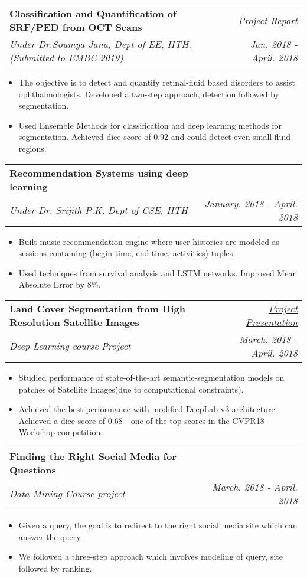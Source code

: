 \documentclass[letterpaper,11pt]{article}
\makeatletter
\newcommand{\resumeSubheading}[4]{
  \vspace{-1pt}\item
    \begin{tabular*}{0.97\textwidth}{l@{\extracolsep{\fill}}r}
      \textbf{#1} & #2 \\
      \textit{\small#3} & \textit{\small #4} \\
    \end{tabular*}\vspace{-5pt}
}
\newcommand{\resumeItemListStart}{\begin{itemize}}
\newcommand{\resumeItemListEnd}{\end{itemize}\vspace{-5pt}}
\makeatother
\begin{document}
      \resumeSubheading
      {Classification and Quantification of SRF/PED from OCT Scans}{\href{https://drive.google.com/open?id=16MOCnB_j7Jf5Y5ZyqeCxNMw7v9Z5hB-H}{{\color{blue}\textit{Project Report}}}}
      {Under Dr.Soumya Jana, Dept of EE, IITH. (Submitted to EMBC 2019)}{Jan. 2018 - April. 2018}
      \resumeItemListStart
      	\itemsep0em
       	\item{The objective is to detect and quantify retinal-fluid based disorders to assist ophthalmologists. Developed a two-step approach, detection followed by segmentation. }
		\item{Used Ensemble Methods for classification and deep learning methods for segmentation. Achieved dice score of 0.92 and could detect even small fluid regions.}
      \resumeItemListEnd
      
      \resumeSubheading
      {Recommendation Systems using deep learning}{}	
      {Under Dr. Srijith P.K, Dept of CSE, IITH}{January. 2018 - April. 2018}
      \resumeItemListStart
      	\itemsep0em
       	\item{Built music recommendation engine where user histories are modeled as sessions containing (begin time, end time, activities) tuples. }
		\item{Used techniques from survival analysis and LSTM networks. Improved Mean Absolute Error by 8\%.}
      \resumeItemListEnd
      
      \resumeSubheading
      {Land Cover Segmentation from High Resolution Satellite Images}{\href{https://drive.google.com/open?id=1X9-JzzfE5uaLExOh8FgHvfzj9-9DsrBF}{{\color{blue}\textit{Project Presentation}}}}
      {Deep Learning course Project}{March. 2018 - April. 2018}
      \resumeItemListStart
      	\itemsep0em
       	\item{Studied performance of state-of-the-art semantic-segmentation models on patches of Satellite Images(due to computational constraints). 
}
		\item{Achieved the best performance with modified DeepLab-v3 architecture. Achieved a dice score of 0.68 - one of the top scores in the CVPR18-Workshop competition.}
      \resumeItemListEnd     
     
      \resumeSubheading
      {Finding the Right Social Media for Questions}{ \href{https://drive.google.com/open?id=1R13GQEIdIHoSOHFMXU-5oLd_m17u8dMc}{\color{blue}{\textit{Project Presentation}} }}
      {Data Mining Course project}{March. 2018 - April. 2018}
      \resumeItemListStart
      	\itemsep0em
       	\item{Given a query, the goal is to redirect to the right social media site which can answer the query. }
       	\item{We followed a three-step approach which involves modeling of query, site followed by ranking.}
      \resumeItemListEnd
     
\end{document}
